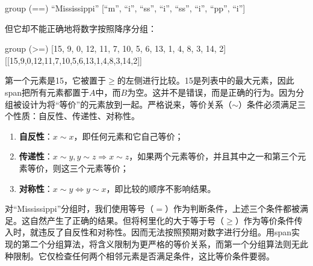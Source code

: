 \documentclass[b5paper]{ctexart}
\begin{document}
\begin{Haskell}
group (==) ``Mississippi''
[``m'', ``i'', ``ss'', ``i'', ``ss'', ``i'', ``pp'', ``i'']
\end{Haskell}

但它却不能正确地将数字按照降序分组：

\begin{Haskell}
group (>=) [15, 9, 0, 12, 11, 7, 10, 5, 6, 13, 1, 4, 8, 3, 14, 2]
[[15,9,0,12,11,7,10,5,6,13,1,4,8,3,14,2]]
\end{Haskell}

第一个元素是15，它被置于$\geq$的左侧进行比较。15是列表中的最大元素，因此span把所有元素都置于$A$中，而$B$为空。这并不是错误，而是正确的行为。因为分组被设计为将“等价”的元素放到一起。严格说来，等价关系（$\sim$）条件必须满足三个性质：自反性、传递性、对称性。

\begin{enumerate}
\item \textbf{自反性}：$x \sim x$，即任何元素和它自己等价；
\item \textbf{传递性}：$x \sim y, y \sim z \Rightarrow x \sim z$，如果两个元素等价，并且其中之一和第三个元素等价，则这三个元素等价；
\item \textbf{对称性}：$x \sim y \Leftrightarrow y \sim x$，即比较的顺序不影响结果。
\end{enumerate}

对“Mississippi”分组时，我们使用等号（$=$）作为判断条件，上述三个条件都被满足。这自然产生了正确的结果。但将柯里化的大于等于号（$\geq$）作为等价条件传入时，就违反了自反性和对称性。因而无法按照预期对数字进行分组。用span实现的第二个分组算法，将含义限制为更严格的等价关系，而第一个分组算法则无此种限制。它仅检查任何两个相邻元素是否满足条件，这比等价条件要弱。

\begin{Exercise}
\end{Exercise}
\end{document}
